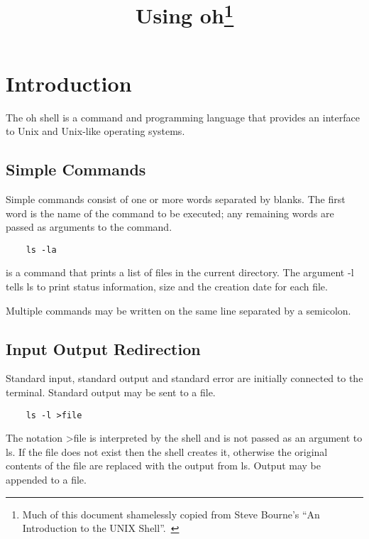 \documentclass[12pt]{book}
\begin{document}

\title{{\Huge \bf Using oh}\thanks{Much of this document
shamelessly copied from Steve Bourne's ``An Introduction to the UNIX
Shell''.~\cite{sh}}}
\author{}
\date{}

\maketitle


\chapter{Introduction}

The oh shell is a command and programming language that provides an
interface to Unix and Unix-like operating systems.



\section{Simple Commands}

Simple commands consist of one or more words separated by blanks.
The first word is the name of the command to be executed; any remaining
words are passed as arguments to the command.

\begin{lstlisting}
	ls -la
\end{lstlisting}

is a command that prints a list of files in the current directory.
The argument -l tells ls to print status information, size and the
creation date for each file.

Multiple commands may be written on the same line separated by a
semicolon.


\section{Input Output Redirection}

Standard input, standard output and standard error are initially
connected to the terminal. Standard output may be sent to a file.  

\begin{lstlisting}
	ls -l >file
\end{lstlisting}

The notation >file is interpreted by the shell and is not passed as
an argument to ls. If the file does not exist then the shell creates
it, otherwise the original contents of the file are replaced with the
output from ls. Output may be appended to a file.
\end{document}
